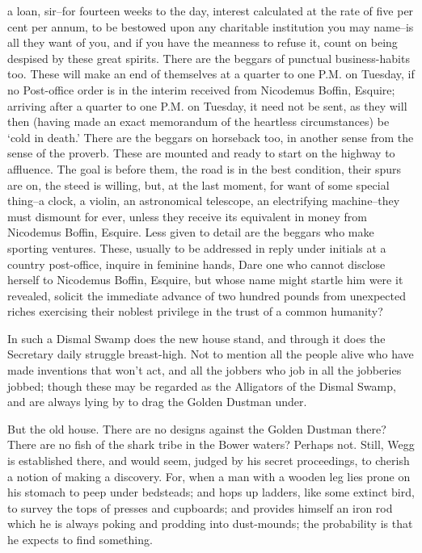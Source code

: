 a loan, sir--for fourteen weeks to the day, interest calculated at the
rate of five per cent per annum, to be bestowed upon any charitable
institution you may name--is all they want of you, and if you have the
meanness to refuse it, count on being despised by these great spirits.
There are the beggars of punctual business-habits too. These will
make an end of themselves at a quarter to one P.M. on Tuesday, if no
Post-office order is in the interim received from Nicodemus Boffin,
Esquire; arriving after a quarter to one P.M. on Tuesday, it need not
be sent, as they will then (having made an exact memorandum of the
heartless circumstances) be ‘cold in death.’ There are the beggars on
horseback too, in another sense from the sense of the proverb. These
are mounted and ready to start on the highway to affluence. The goal is
before them, the road is in the best condition, their spurs are on,
the steed is willing, but, at the last moment, for want of some special
thing--a clock, a violin, an astronomical telescope, an electrifying
machine--they must dismount for ever, unless they receive its equivalent
in money from Nicodemus Boffin, Esquire. Less given to detail are the
beggars who make sporting ventures. These, usually to be addressed
in reply under initials at a country post-office, inquire in feminine
hands, Dare one who cannot disclose herself to Nicodemus Boffin,
Esquire, but whose name might startle him were it revealed, solicit
the immediate advance of two hundred pounds from unexpected riches
exercising their noblest privilege in the trust of a common humanity?

In such a Dismal Swamp does the new house stand, and through it does
the Secretary daily struggle breast-high. Not to mention all the people
alive who have made inventions that won’t act, and all the jobbers who
job in all the jobberies jobbed; though these may be regarded as the
Alligators of the Dismal Swamp, and are always lying by to drag the
Golden Dustman under.

But the old house. There are no designs against the Golden Dustman
there? There are no fish of the shark tribe in the Bower waters? Perhaps
not. Still, Wegg is established there, and would seem, judged by his
secret proceedings, to cherish a notion of making a discovery. For,
when a man with a wooden leg lies prone on his stomach to peep under
bedsteads; and hops up ladders, like some extinct bird, to survey the
tops of presses and cupboards; and provides himself an iron rod which he
is always poking and prodding into dust-mounds; the probability is that
he expects to find something.


